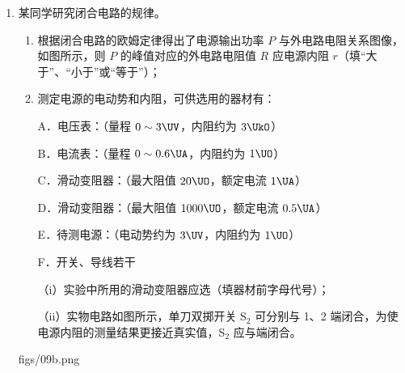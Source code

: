 \documentclass[\gkver]{gaokaozhenti}
\begin{document}
\begin{enumerate}
{CD．根据沿电场线方向电势逐渐降低，结合题图可知，c 点左侧电场方向沿 $x$ 轴正方向，c 点右侧电场方向沿 $x$ 轴负方向，可知，c 点右侧负电荷受沿 $x$ 轴正方向的电场力，c 点左侧负电荷受沿 $x$ 轴负方向的电场力，可知，在 a 点受静电力沿 $x$ 轴负方向，从 d 点开始沿 $x$ 轴负方向运动到 a 点，电场力先做负功再做正功，故 C 错误，D 正确。

故选 BD。
}

\item
某同学研究闭合电路的规律。
\begin{enumerate}
	\item
	根据闭合电路的欧姆定律得出了电源输出功率 $P$ 与外电路电阻关系图像，如图所示，则 $P$ 的峰值对应的外电路电阻值 $R$ 应电源内阻 $r$（填“大于”、“小于”或“等于”）；
	\item
	测定电源的电动势和内阻，可供选用的器材有：

	A．电压表：（量程 $0 \sim 3 \UV$，内阻约为 $3 \UkO$）

	B．电流表：（量程 $0 \sim 0.6 \UA$，内阻约为 $1 \UO$）

	C．滑动变阻器：（最大阻值 $20 \UO$，额定电流 $1 \UA$）

	D．滑动变阻器：（最大阻值 $1000 \UO$，额定电流 $0.5 \UA$）

	E．待测电源：（电动势约为 $3 \UV$，内阻约为 $1 \UO$）

	F．开关、导线若干

	（i）实验中所用的滑动变阻器应选（填器材前字母代号）；

	（ii）实物电路如图所示，单刀双掷开关 S$_{2}$ 可分别与 1、2 端闭合，为使电源内阻的测量结果更接近真实值，S$_{2}$ 应与端闭合。
\end{enumerate}
{figs/09b.png}
\end{enumerate}
\end{document}
